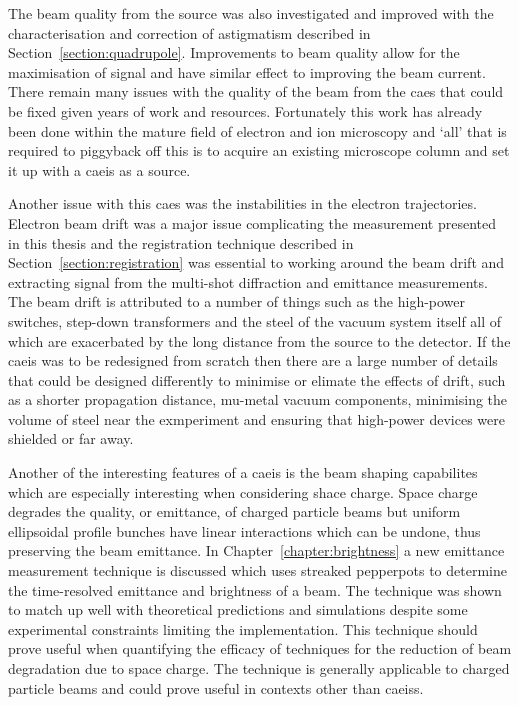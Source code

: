 The beam quality from the source was also investigated and improved with the characterisation and correction of astigmatism described in Section~\ref{section:quadrupole}.
Improvements to beam quality allow for the maximisation of signal and have similar effect to improving the beam current.
There remain many issues with the quality of the beam from the \gls{caes} that could be fixed given years of work and resources.
Fortunately this work has already been done within the mature field of electron and ion microscopy and `all' that is required to piggyback off this is to acquire an existing microscope column and set it up with a \gls{caeis} as a source.

Another issue with this \gls{caes} was the instabilities in the electron trajectories.
Electron beam drift was a major issue complicating the measurement presented in this thesis and the registration technique described in Section~\ref{section:registration} was essential to working around the beam drift and extracting signal from the multi-shot diffraction and emittance measurements.
The beam drift is attributed to a number of things such as the high-power switches, step-down transformers and the steel of the vacuum system itself all of which are exacerbated by the long distance from the source to the detector.
If the \gls{caeis} was to be redesigned from scratch then there are a large number of details that could be designed differently to minimise or elimate the effects of drift, such as a shorter propagation distance, mu-metal vacuum components, minimising the volume of steel near the exmperiment and ensuring that high-power devices were shielded or far away.

Another of the interesting features of a \gls{caeis} is the beam shaping capabilites which are especially interesting when considering shace charge.
Space charge degrades the quality, or emittance, of charged particle beams but uniform ellipsoidal profile bunches have linear interactions which can be undone, thus preserving the beam emittance.
In Chapter~\ref{chapter:brightness} a new emittance measurement technique is discussed which uses streaked pepperpots to determine the time-resolved emittance and brightness of a beam.
The technique was shown to match up well with theoretical predictions and simulations despite some experimental constraints limiting the implementation.
This technique should prove useful when quantifying the efficacy of techniques for the reduction of beam degradation due to space charge.
The technique is generally applicable to charged particle beams and could prove useful in contexts other than \glspl{caeis}.

